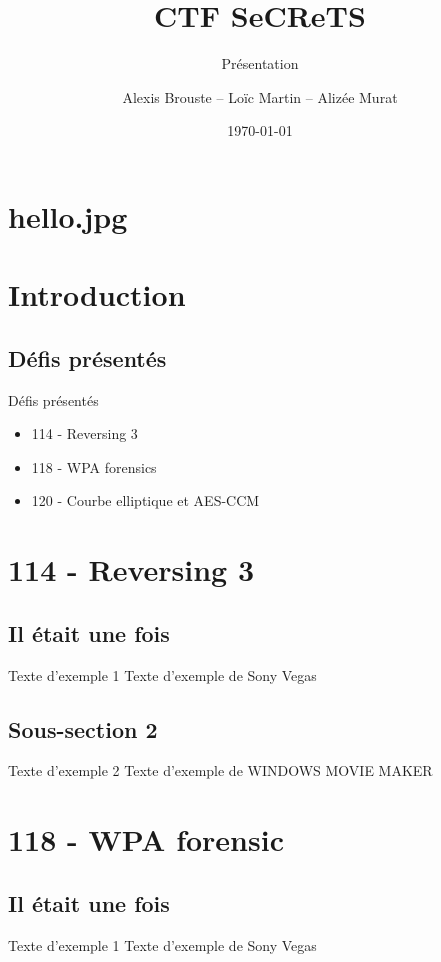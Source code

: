 \documentclass[10pt,sans,usenames,dvipsnames,french,compress]{beamer}
\title{CTF SeCReTS}
\subtitle{Présentation}
\author{Alexis Brouste -- Loïc Martin -- Alizée Murat}
\date{\today{}}
\institute[UVSQ]{UVSQ}
\begin{document}
\section{hello.jpg}
\begin{frame}[plain]
	\titlepage
\end{frame}

\section{Introduction}
\subsection{Défis présentés}
\begin{frame}{Défis présentés}
	\begin{itemize}
		\item 114 - Reversing 3
		\item 118 - WPA forensics
		\item 120 - Courbe elliptique et AES-CCM
	\end{itemize}
\end{frame}

\section{114 - Reversing 3}
\subsection{Il était une fois}
\begin{frame}{Texte d'exemple 1}
	Texte d'exemple de Sony Vegas
\end{frame}

\subsection{Sous-section 2}
\begin{frame}{Texte d'exemple 2}
	Texte d'exemple de WINDOWS MOVIE MAKER
\end{frame}

\section{118 - WPA forensic}
\subsection{Il était une fois}
\begin{frame}{Texte d'exemple 1}
	Texte d'exemple de Sony Vegas
\end{frame}
\end{document}
